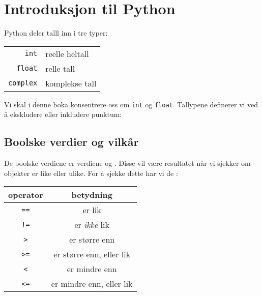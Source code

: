 





\section{Introduksjon til Python}

Python deler talll inn i tre typer:
\begin{center}
	\begin{tabular}{r|l}
		\texttt{int} & reelle heltall \\
		\texttt{float} & relle tall \\
		\texttt{complex} & komplekse tall
	\end{tabular} 
\end{center}
Vi skal i denne boka konsentrere oss om \texttt{int} og \texttt{float}. Tallypene definerer vi ved å ekskludere eller inkludere punktum:
\subsection*{Boolske verdier og vilkår}
De boolske verdiene er verdiene  og . Disse vil være resultatet når vi sjekker om objekter er like eller ulike. For å sjekke dette har vi de :
\begin{center}
	\begin{tabular}{c|c}
		\textbf{operator} & \textbf{betydning} \\ \hline
		\texttt{==}	& er lik \\ \rowcolor{gray!10}
		\texttt{!=} & er \textsl{ikke} lik\\
		\texttt{>} & er større enn \\ \rowcolor{gray!10}
		\texttt{>=} & er større enn, eller lik \\
		\texttt{<} & er mindre enn \\ \rowcolor{gray!10}
		\texttt{<=} & er mindre enn, eller lik \\		
	\end{tabular}
\end{center}
\vsk

